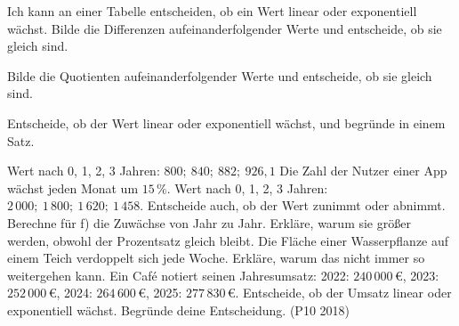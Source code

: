 \begin{aufgabe}{Ich kann an einer Tabelle entscheiden, ob ein Wert linear oder exponentiell wächst. Bilde die Differenzen aufeinanderfolgender Werte und entscheide, ob sie gleich sind.}
\begin{geruest}
\end{geruest}
Bilde die Quotienten aufeinanderfolgender Werte und entscheide, ob sie gleich sind.
\begin{geruest}
\end{geruest}
Entscheide, ob der Wert linear oder exponentiell wächst, und begründe in einem Satz.
\begin{teile}
\teil Wert nach 0, 1, 2, 3 Jahren: $800;\ 840;\ 882;\ 926{,}1$ \hfill {}
\teil Die Zahl der Nutzer einer App wächst jeden Monat um $15\,\%$. \hfill {}
\teil Wert nach 0, 1, 2, 3 Jahren: $2\,000;\ 1\,800;\ 1\,620;\ 1\,458$. Entscheide auch, ob der Wert zunimmt oder abnimmt. \\ \qquad{}
\teil Berechne für f) die Zuwächse von Jahr zu Jahr. Erkläre, warum sie größer werden, obwohl der Prozentsatz gleich bleibt.
\teil Die Fläche einer Wasserpflanze auf einem Teich verdoppelt sich jede Woche. Erkläre, warum das nicht immer so weitergehen kann.
\teil Ein Café notiert seinen Jahresumsatz: 2022: $240\,000\,€$, 2023: $252\,000\,€$, 2024: $264\,600\,€$, 2025: $277\,830\,€$. Entscheide, ob der Umsatz linear oder exponentiell wächst. Begründe deine Entscheidung. (P10 2018)
\end{teile}
\end{aufgabe}

